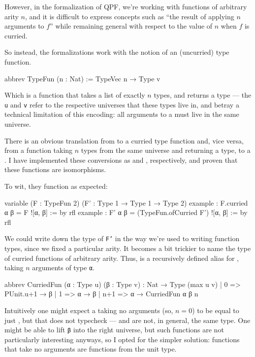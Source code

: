\documentclass[titlepage]{report}
\begin{document}
However, in the formalization of QPF, we're working with functions of arbitrary arity $n$, and it 
is difficult to express concepts such as ``the result of applying $n$ arguments to $f$'' while remaining
general with respect to the value of $n$ when $f$ is curried.

So instead, the formalizations work with the notion of an (uncurried) type function.

\begin{leancode}
    abbrev TypeFun (n : Nat)
      := TypeVec n → Type v
\end{leancode}

Which is a function that takes a list of exactly $n$ types, and returns a type --- the \texttt{u} and
\texttt{v} refer to the respective universes that these types live in, and betray a technical limitation
of this encoding: all arguments to a  must live in the same universe.

There is an obvious translation from  to a curried type function and, vice versa, from
a function taking $n$ types from the same universe and returning a type, to a .
I have implemented these conversions as  and , respectively,
and proven that these functions are isomorphisms. 

To wit, they function as expected:
\begin{leancode}
    variable (F : TypeFun 2) (F' : Type 1 → Type 1 → Type 2)
    example : F.curried α β = F ![α, β]                 := by rfl
    example : F' α β = (TypeFun.ofCurried F') ![α, β]   := by rfl
\end{leancode}

We could write down the type of \texttt{F'} in the way we're used to writing function types, since
we fixed a particular arity. 
It becomes a bit trickier to name the type of curried functions of arbitrary arity.
Thus,  is a recursively defined alias for , 
taking $n$ arguments of type \texttt{α}.
\begin{leancode}
    abbrev CurriedFun (α : Type u) (β : Type v) : Nat → Type (max u v)
      | 0   => PUnit.{u+1} → β
      | 1   => α → β
      | n+1 => α → CurriedFun α β n
\end{leancode}
Intuitively one might expect a  taking no arguments (so, $n = 0$) to be equal to 
just , but that does not typecheck ---  and  are not, in general, the same type.
One might be able to lift \texttt{β} into the right universe, but such functions are not particularly
interesting anyways, so I opted for the simpler solution: functions that take no arguments are
functions from the unit type.
\end{document}
